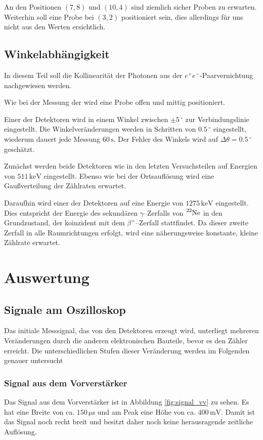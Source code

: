 \documentclass[12pt,a4paper]{scrartcl}
\numberwithin{equation}{section} %
\newcommand{\pu}[1]{\ensuremath{\mathrm{#1}}}
\begin{document}
An den Positionen $(7,8)$ und $(10,4)$ sind ziemlich sicher Proben zu erwarten. Weiterhin soll eine Probe bei $(3, 2)$ positioniert sein, dies allerdings für uns nicht aus den Werten ersichtlich.

\subsection{Winkelabhängigkeit}
In diesem Teil soll die Kollinearität der Photonen aus der $e^+e^-$-Paarvernichtung nachgewiesen werden.

Wie bei der Messung der  wird eine Probe offen und mittig positioniert.

Einer der Detektoren wird in einem Winkel zwischen $\pm 5\,^\circ$ zur Verbindungslinie eingestellt. Die Winkelveränderungen werden in Schritten von $0.5\,^\circ$ eingestellt, wiederum dauert jede Messung $60\,\mathrm{s}$. Der Fehler des Winkels wird auf $\Delta \theta = \pu{0.5\,^\circ}$ geschätzt.

Zunächst werden beide Detektoren wie in den letzten Versuchsteilen auf Energien von $\pu{511\,keV}$ eingestellt. Ebenso wie bei der Ortsauflösung wird eine Gaußverteilung der Zählraten erwartet.

Daraufhin wird einer der Detektoren auf eine Energie von $\pu{1275\,keV}$ eingestellt. Dies entspricht der Energie des sekundären $\gamma$--Zerfalls von $\ce{^{22}Ne}$ in den Grundzustand, der koinzident mit dem $\beta^+$--Zerfall stattfindet. Da dieser zweite Zerfall in alle Raumrichtungen erfolgt, wird eine näherungsweise konstante, kleine Zählrate erwartet.

\clearpage
\hypertarget{auswertung}{%
\section{Auswertung}\label{auswertung}}

\subsection{Signale am Oszilloskop}
Das initiale Messsignal, das von den Detektoren erzeugt wird, unterliegt mehreren Veränderungen durch die anderen elektronischen Bauteile, bevor es den Zähler erreicht. Die unterschiedlichen Stufen dieser Veränderung werden im Folgenden genauer untersucht

\subsubsection{Signal aus dem Vorverstärker}
Das Signal aus dem Vorverstärker ist in Abbildung \ref{fig:signal_vv} zu sehen. Es hat eine Breite von ca. $150 \mathrm{\, \mu s}$ und am Peak eine Höhe von ca. $400 \mathrm{\, mV}$. Damit ist das Signal noch recht breit und besitzt daher noch keine herausragende zeitliche Auflösung.
\end{document}
